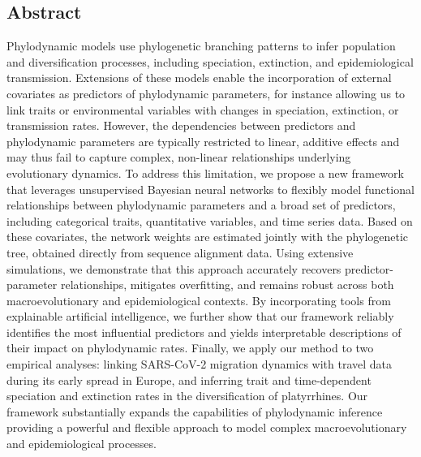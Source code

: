 \subsection*{Abstract}

Phylodynamic models use phylogenetic branching patterns to infer population and diversification processes, including speciation, extinction, and epidemiological transmission.
Extensions of these models enable the incorporation of external covariates as predictors of phylodynamic parameters, for instance allowing us to link traits or environmental variables with changes in speciation, extinction, or transmission rates. 
However, the dependencies between predictors and phylodynamic parameters are typically restricted to linear, additive effects and may thus fail to capture complex, non-linear relationships underlying evolutionary dynamics.
To address this limitation, we propose a new framework that leverages unsupervised Bayesian neural networks to flexibly model functional relationships between phylodynamic parameters and a broad set of predictors, including categorical traits, quantitative variables, and time series data.
Based on these covariates, the network weights are estimated jointly with the phylogenetic tree, obtained directly from sequence alignment data. Using extensive simulations, we demonstrate that this approach accurately recovers predictor-parameter relationships, mitigates overfitting, and remains robust across both macroevolutionary and epidemiological contexts.
By incorporating tools from explainable artificial intelligence, we further show that our framework reliably identifies the most influential predictors and yields interpretable descriptions of their impact on phylodynamic rates.
Finally, we apply our method to two empirical analyses: linking SARS-CoV-2 migration dynamics with travel data during its early spread in Europe, and inferring trait and time-dependent speciation and extinction rates in the diversification of platyrrhines. Our framework substantially expands the capabilities of phylodynamic inference providing a powerful and flexible approach to model complex macroevolutionary and epidemiological processes.

